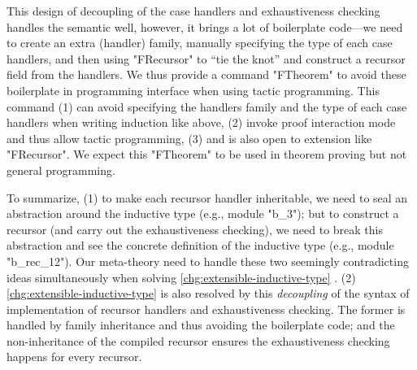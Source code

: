 

This design of decoupling of the case handlers and exhaustiveness checking handles the semantic well, however, it brings a lot of boilerplate code---we need to create an extra (handler) family, manually specifying the type of each case handlers, and then using "FRecursor" to ``tie the knot'' and construct a recursor field from the handlers.  
We thus provide a command "FTheorem" to avoid these boilerplate in programming interface when using tactic programming. 
This command (1) can avoid specifying the handlers family and the type of each case handlers when writing induction like above, (2) invoke
proof interaction mode and thus allow tactic programming, (3) and is also open to extension like "FRecursor". We expect this "FTheorem" to be used in theorem proving but not general programming. 

To summarize, (1) to make each recursor
handler inheritable, we need to seal an abstraction around the inductive
type (e.g., module "b_3"); but to construct a recursor (and carry out the
exhaustiveness checking), we need to break this abstraction and see the
concrete definition of the inductive type (e.g., module "b_rec_12"). Our
meta-theory need to handle these two seemingly contradicting ideas
simultaneously when solving \ref{chg:extensible-inductive-type} . (2) \ref{chg:extensible-inductive-type} is also resolved by this \textit{decoupling} of the syntax of implementation of recursor handlers and exhaustiveness checking. The former is handled by family inheritance and thus avoiding the boilerplate code; and the non-inheritance of the compiled recursor ensures the exhaustiveness checking happens for every recursor.  



